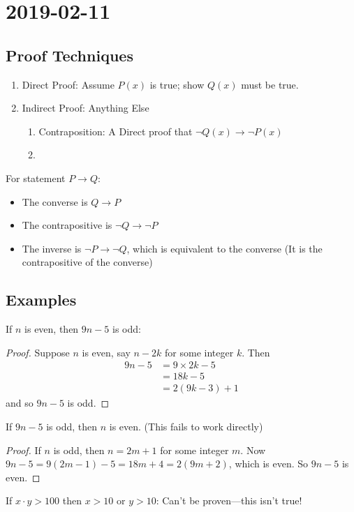 \documentclass{article}
\theoremstyle{definition}
\begin{document}
\section*{2019-02-11}
\subsection*{Proof Techniques}
\begin{enumerate}
  \item Direct Proof: Assume $P(x)$ is true; show $Q(x)$ must be true.
  \item Indirect Proof: Anything Else
    \begin{enumerate}
      \item Contraposition: A Direct proof that $\neg Q(x) \to \neg P(x)$
      \item
    \end{enumerate}
\end{enumerate}

For statement $P \to Q$:
\begin{itemize}
  \item The converse is $Q \to P$
  \item The contrapositive is $\neg Q \to \neg P$
  \item The inverse is $\neg P \to \neg Q$, which is equivalent to the
    converse (It is the contrapositive of the converse)
\end{itemize}

\subsection*{Examples}

If $n$ is even, then $9n-5$ is odd:
\begin{proof}
  Suppose $n$ is even, say $n-2k$ for some integer $k$. Then
  \begin{align*}
    9n-5 &= 9\times2k -5\\
    &= 18k-5\\
    &= 2(9k-3) + 1
  \end{align*}
  and so $9n-5$ is odd.
\end{proof}

If $9n-5$ is odd, then $n$ is even. (This fails to work directly)
\begin{proof}
  If $n$ is odd, then $n=2m+1$ for some integer $m$. Now $9n-5=9(2m-1)-5=18m+4=2(9m+2)$, which is even.
  So $9n-5$ is even.
\end{proof}

If $x \cdot y > 100$ then $x > 10$ or $y > 10$:
Can't be proven---this isn't true!
\end{document}
